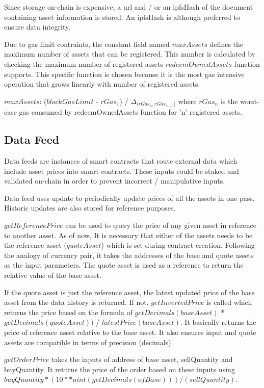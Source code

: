 \documentclass[conference]{IEEEtran}
\begin{document}
Since storage on-chain is expensive, a url and / or an ipfsHash of the document containing asset information is stored. An ipfsHash is although preferred to ensure data integrity.

Due to gas limit contraints, the constant field named $maxAssets$ defines the maximum number of assets that can be registered. This number is calculated by checking the maximum number of registered assets $redeemOwnedAssets$ function supports. This specific function is chosen because it is the most gas intensive operation that grows linearly with number of registered assets. 


$maxAssets$: ($blockGasLimit$ - $rGas_1$) /  $\Delta_{(rGas_n, rGas_{n-1}]}$ where $rGas_n$ is the worst-case gas consumed by redeemOwnedAssets function for 'n' registered assets.

\subsection{Data Feed}  \label{component:data-feed}

Data feeds are instances of smart contracts that route external data which include asset prices into smart contracts. These inputs could be staked and validated on-chain in order to prevent incorrect / manipulative inputs.  

Data feed uses update to periodically update prices of all the assets in one pass. Historic updates are also stored for reference purposes.

$getReferencePrice$ can be used to query the price of any given asset in reference to another asset. As of now, It is necessary that either of the assets needs to be the reference asset ($quoteAsset$) which is set during contract creation. Following the analogy of currency pair, it takes the addresses of the base and quote assets as the input parameters. The quote asset is used as a reference to return the relative value of the base asset.

If the quote asset is just the reference asset, the latest updated price of the base asset from the data history is returned. If not, $getInvertedPrice$ is called which returns the price based on the formula of $getDecimals(baseAsset)$  * $getDecimals(quoteAsset))$ / $latestPrice(baseAsset)$. It basically returns the price of reference asset relative to the base asset. It also ensures input and quote assets are compatible in terms of precision (decimals).

$getOrderPrice$ takes the inputs of address of base asset, sellQuantity and buyQuantity. It returns the price of the order based on these inputs using $buyQuantity * (10 ** uint(getDecimals(ofBase))) / (sellQuantity)$. 
\end{document}
